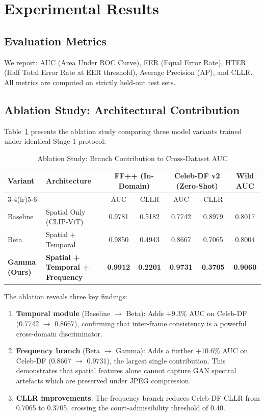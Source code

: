 \documentclass[journal]{IEEEtran}
\begin{document}
\section{Experimental Results}
\label{sec:results}

\subsection{Evaluation Metrics}
We report: AUC (Area Under ROC Curve), EER (Equal Error Rate), HTER (Half Total Error Rate at EER threshold), Average Precision (AP), and CLLR. All metrics are computed on strictly held-out test sets.

\subsection{Ablation Study: Architectural Contribution}
Table~\ref{tab:ablation} presents the ablation study comparing three model variants trained under identical Stage 1 protocol:

\begin{table}[!t]
\renewcommand{\arraystretch}{1.3}
\caption{Ablation Study: Branch Contribution to Cross-Dataset AUC}
\label{tab:ablation}
\centering
\begin{tabular}{llccccc}
\toprule
\textbf{Variant} & \textbf{Architecture} & \multicolumn{2}{c}{\textbf{FF++ (In-Domain)}} & \multicolumn{2}{c}{\textbf{Celeb-DF v2 (Zero-Shot)}} & \textbf{Wild AUC} \\
\cmidrule(lr){3-4}\cmidrule(lr){5-6}
& & AUC & CLLR & AUC & CLLR & \\
\midrule
Baseline & Spatial Only (CLIP-ViT) & 0.9781 & 0.5182 & 0.7742 & 0.8979 & 0.8017 \\
Beta     & Spatial + Temporal      & 0.9850 & 0.4943 & 0.8667 & 0.7065 & 0.8004 \\
\textbf{Gamma (Ours)} & \textbf{Spatial + Temporal + Frequency} & \textbf{0.9912} & \textbf{0.2201} & \textbf{0.9731} & \textbf{0.3705} & \textbf{0.9060} \\
\bottomrule
\end{tabular}
\end{table}

The ablation reveals three key findings:
\begin{enumerate}
    \item \textbf{Temporal module} (Baseline $\to$ Beta): Adds +9.3\% AUC on Celeb-DF (0.7742 $\to$ 0.8667), confirming that inter-frame consistency is a powerful cross-domain discriminator.
    \item \textbf{Frequency branch} (Beta $\to$ Gamma): Adds a further +10.6\% AUC on Celeb-DF (0.8667 $\to$ 0.9731), the largest single contribution. This demonstrates that spatial features alone cannot capture GAN spectral artefacts which are preserved under JPEG compression.
    \item \textbf{CLLR improvements}: The frequency branch reduces Celeb-DF CLLR from 0.7065 to 0.3705, crossing the court-admissibility threshold of 0.40.
\end{enumerate}
\end{document}
